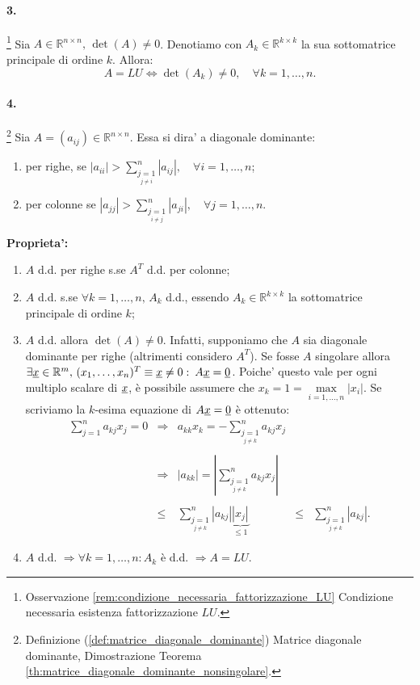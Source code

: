 \paragraph{3.}\footnote{Osservazione \ref{rem:condizione_necessaria_fattorizzazione_LU} Condizione necessaria esistenza fattorizzazione $LU$.} Sia $A\in\mathbb{R}^{n \times n},\, \det(A)\neq 0$. Denotiamo con $A_k\in\mathbb{R}^{k\times k}$ la sua sottomatrice principale di ordine $k$. Allora:
\begin{equation*}
	A = LU \iff \det(A_k)\neq 0,\quad\forall k=1,\hdots, n.
\end{equation*}

\paragraph{4.}\footnote{Definizione (\ref{def:matrice_diagonale_dominante}) Matrice diagonale dominante, Dimostrazione Teorema \ref{th:matrice_diagonale_dominante_nonsingolare}.} Sia $A=(a_{ij})\in\mathbb{R}^{n \times n}$. Essa si dira' a diagonale dominante:
\begin{enumerate}
	\item per righe, se $|a_{ii}|>\sum_{\underset{j\neq i}{j=1}}^n |a_{ij}|,\quad 
	\forall i=1,\hdots, n$;
	\item per colonne se $|a_{jj}|>\sum_{\underset{i\neq j}{j=1}}^n|a_{ji}|,\quad \forall j=1,\hdots,n$.
\end{enumerate}
\textbf{Proprieta':}
\begin{enumerate}
	\item $A$ d.d. per righe s.se $A^T$ d.d. per colonne;
	\item $A$ d.d. s.se $\forall k=1,\hdots, n,\, A_k$ d.d., essendo $A_k\in\mathbb{R}^{k\times k}$ la sottomatrice principale di ordine $k$;
	\item $A$ d.d. allora $\det(A)\neq 0$. Infatti, supponiamo che $A$ sia diagonale dominante per righe (altrimenti considero $A^T$). Se fosse $A$ singolare allora $\exists \uline x\in\mathbb{R}^m,\, (x_1,\hdots, x_n)^T\equiv \uline x \neq 0\,\colon\, A\uline x = \uline 0$. Poiche' questo vale per ogni multiplo scalare di $\uline x$, è possibile assumere che $x_k=1=\underset{i=1,\hdots, n}{\max}|x_i|$. Se scriviamo la $k$-esima equazione di $A\uline x=\uline 0$ è ottenuto:
	\begin{equation*}
		\begin{matrix}
			\sum_{j=1}^{n}a_{kj} x_j=0 &\Rightarrow& a_{kk}x_k = -\sum_{\underset{j\neq k}{j=1}}^{n}a_{kj} x_j && \\\\
			&\Rightarrow& |a_{kk}| = \left|\sum_{\underset{j\neq k}{j=1}}^{n}a_{kj} x_j\right| &&\\\\
			&\leq& \sum_{\underset{j\neq k}{j=1}}^{n}|a_{kj}| \underbrace{|x_j|}_{\leq 1} &\leq& \sum_{\underset{j\neq k}{j=1}}^{n}|a_{kj}|.
		\end{matrix}
	\end{equation*}
	\item $A$ d.d. $\Rightarrow\forall k=1,\hdots,n\colon A_k$ è d.d. $\Rightarrow A=LU$.
\end{enumerate}

